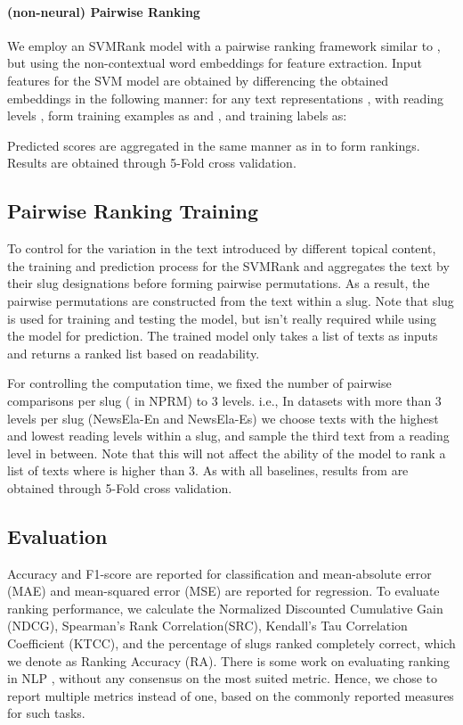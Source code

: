 \documentclass[11pt]{article}
\begin{document}
\paragraph{(non-neural) Pairwise Ranking}
We employ an SVMRank model with a pairwise ranking framework similar to , but using the non-contextual word embeddings for feature extraction. Input features for the SVM model are obtained by differencing the obtained embeddings in the following manner: for any text representations , with reading levels , form training examples as  and ,  and training labels as: 

{\centering
   
\par}
Predicted scores are aggregated in the same manner as in  to form rankings.  Results are obtained through 5-Fold cross validation.

\subsection{Pairwise Ranking Training}
To control for the variation in the text introduced by different topical content, the training and prediction process for the SVMRank and  aggregates the text by their slug designations before forming pairwise permutations. As a result, the pairwise permutations are constructed from the text within a slug. Note that slug is used for training and testing the model, but isn't really required while using the model for prediction. The trained model only takes a list of texts as inputs and returns a ranked list based on readability.

For controlling the computation time, we fixed the number of pairwise comparisons per slug ( in NPRM) to 3 levels. i.e., In datasets with more than 3 levels per slug (NewsEla-En and NewsEla-Es) we choose texts with the highest and lowest reading levels within a slug, and sample the third text from a reading level in between. Note that this will not affect the ability of the model to rank a list of texts where  is higher than 3. As with all baselines, results from  are obtained through 5-Fold cross validation.

\subsection{Evaluation}
Accuracy and F1-score are reported for classification and mean-absolute error (MAE) and mean-squared error (MSE) are reported for regression. To evaluate ranking performance, we calculate the Normalized Discounted Cumulative Gain (NDCG), Spearman's Rank Correlation(SRC), Kendall's Tau Correlation Coefficient (KTCC), and the percentage of slugs ranked completely correct, which we denote as Ranking Accuracy (RA). There is some work on evaluating ranking in NLP \cite{Lapata-06,Katerenchuk.Rosenberg-16}, without any consensus on the most suited metric. Hence, we chose to report multiple metrics instead of one, based on the commonly reported measures for such tasks.
\end{document}
